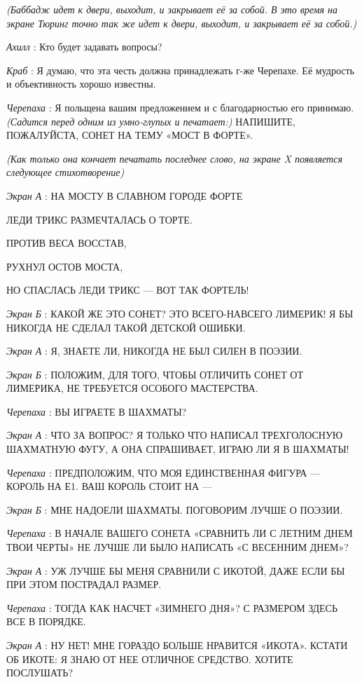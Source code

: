 \documentclass[../main.tex]{subfiles}
\begin{document}
\begin{dialogue}
\emph{(Баббадж идет к двери, выходит, и закрывает её за собой. В это время на экране Тюринг точно так же идет к двери, выходит, и закрывает её за собой.)}

\emph{Ахилл} : Кто будет задавать вопросы?

\emph{Краб} : Я думаю, что эта честь должна принадлежать г-же Черепахе. Её мудрость и объективность хорошо известны.

\emph{Черепаха} : Я польщена вашим предложением и с благодарностью его принимаю. \emph{(Садится перед одним из умно-глупых и печатает:)} НАПИШИТЕ, ПОЖАЛУЙСТА, СОНЕТ НА ТЕМУ «МОСТ В ФОРТЕ».

\emph{(Как только она кончает печатать последнее слово, на экране X появляется следующее стихотворение)}

\emph{Экран А} : НА МОСТУ В СЛАВНОМ ГОРОДЕ ФОРТЕ

ЛЕДИ ТРИКС РАЗМЕЧТАЛАСЬ О ТОРТЕ.

ПРОТИВ ВЕСА ВОССТАВ,

РУХНУЛ ОСТОВ МОСТА,

НО СПАСЛАСЬ ЛЕДИ ТРИКС --- ВОТ ТАК ФОРТЕЛЬ!

\emph{Экран Б} : КАКОЙ ЖЕ ЭТО СОНЕТ? ЭТО ВСЕГО-НАВСЕГО ЛИМЕРИК! Я БЫ НИКОГДА НЕ СДЕЛАЛ ТАКОЙ ДЕТСКОЙ ОШИБКИ.

\emph{Экран А} : Я, ЗНАЕТЕ ЛИ, НИКОГДА НЕ БЫЛ СИЛЕН В ПОЭЗИИ.

\emph{Экран Б} : ПОЛОЖИМ, ДЛЯ ТОГО, ЧТОБЫ ОТЛИЧИТЬ СОНЕТ ОТ ЛИМЕРИКА, НЕ ТРЕБУЕТСЯ ОСОБОГО МАСТЕРСТВА.

\emph{Черепаха} : ВЫ ИГРАЕТЕ В ШАХМАТЫ?

\emph{Экран А} : ЧТО ЗА ВОПРОС? Я ТОЛЬКО ЧТО НАПИСАЛ ТРЕХГОЛОСНУЮ ШАХМАТНУЮ ФУГУ, А ОНА СПРАШИВАЕТ, ИГРАЮ ЛИ Я В ШАХМАТЫ!

\emph{Черепаха} : ПРЕДПОЛОЖИМ, ЧТО МОЯ ЕДИНСТВЕННАЯ ФИГУРА --- КОРОЛЬ НА Е1. ВАШ КОРОЛЬ СТОИТ НА ---

\emph{Экран Б} : МНЕ НАДОЕЛИ ШАХМАТЫ. ПОГОВОРИМ ЛУЧШЕ О ПОЭЗИИ.

\emph{Черепаха} : В НАЧАЛЕ ВАШЕГО СОНЕТА «СРАВНИТЬ ЛИ С ЛЕТНИМ ДНЕМ ТВОИ ЧЕРТЫ» НЕ ЛУЧШЕ ЛИ БЫЛО НАПИСАТЬ «С ВЕСЕННИМ ДНЕМ»?

\emph{Экран А} : УЖ ЛУЧШЕ БЫ МЕНЯ СРАВНИЛИ С ИКОТОЙ, ДАЖЕ ЕСЛИ БЫ ПРИ ЭТОМ ПОСТРАДАЛ РАЗМЕР.

\emph{Черепаха} : ТОГДА КАК НАСЧЕТ «ЗИМНЕГО ДНЯ»? С РАЗМЕРОМ ЗДЕСЬ ВСЕ В ПОРЯДКЕ.

\emph{Экран А} : НУ НЕТ! МНЕ ГОРАЗДО БОЛЬШЕ НРАВИТСЯ «ИКОТА». КСТАТИ ОБ ИКОТЕ: Я ЗНАЮ ОТ НЕЕ ОТЛИЧНОЕ СРЕДСТВО. ХОТИТЕ ПОСЛУШАТЬ?


\end{dialogue}
\end{document}
